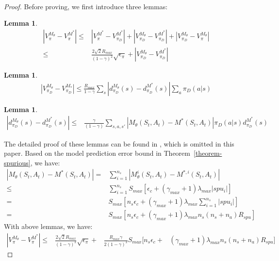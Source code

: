 \documentclass{article}
\theoremstyle{plain}
\newtheorem{lemma}[theorem]{Lemma}
\theoremstyle{definition}
\theoremstyle{remark}
\begin{document}
\begin{proof}

Before proving, we first introduce three lemmas:
\begin{lemma}
\begin{align*}
    |V_{\pi}^{M_\theta}-V_{\pi}^{M^*}|\leq& |V_{\pi}^{M^*}-V_{\pi_D}^{M^*}|+ |V_{\pi_D}^{M_\theta}-V_{\pi_D}^{M^*}|
    +|V_{\pi_D}^{M_\theta}-V_{\pi}^{M_\theta}| \\
     \leq&\frac{2\sqrt{2}R_{max}}{(1-\gamma)^2}\sqrt{\epsilon_\pi}+|V_{\pi_D}^{M_\theta}-V_{\pi_D}^{M^*}|
\end{align*}
\end{lemma}

\begin{lemma}
\begin{align*}
    |V_{\pi_D}^{M_{\theta}}-V_{\pi_D}^{M_{*}}|\leq \frac{R_{max}}{1-\gamma}\sum_s|d_{\pi_D}^{M_\theta}(s)-d_{\pi_D}^{M^*}(s)|\sum_a\pi_D(a|s)
\end{align*}
\end{lemma}

\begin{lemma}
\begin{align*}
    |d_{\pi_D}^{M_\theta}(s)-d_{\pi_D}^{M^*}(s)|
\leq& \frac{\gamma}{(1-\gamma)}\sum_{s,a,s'}|M_\theta(S_t,A_t)-M^*(S_t,A_t)| 
    \pi_D(a|s)d_{\pi_D}^{M^*}(s)
\end{align*}
\end{lemma}
The detailed proof of these lemmas can be found in \cite{DBLP:conf/nips/XuLY20}, which is omitted in this paper.
Based on the model prediction error bound in Theorem~\ref{theorem-spurious}, we have:
\begin{align*}
|M_\theta(S_t,A_t)-M^*(S_t,A_t)|
=&\sum_{i=1}^{n_s}|M_\theta^i(S_t,A_t)-M^{*,i}(S_t,A_t)| \\
\leq&\sum_{i=1}^{n_s} S_{max}[\epsilon_c+(\gamma_{max}+1)\lambda_{max}|spu_i|] \\
=&S_{max}[{n_s}\epsilon_c+(\gamma_{max}+1)\lambda_{max}\sum_{i=1}^{n_s}|spu_i|]\\
=&S_{max}[{n_s}\epsilon_c+(\gamma_{max}+1)\lambda_{max}n_s(n_s+n_a)R_{spu}]
\end{align*}
With above lemmas, we have: 
\begin{align*}
|V_{\pi}^{M_\theta}-V_{\pi}^{M^*}|\leq &
\frac{2\sqrt{2}R_{max}}{(1-\gamma)^2}\sqrt{\epsilon_{\pi}}+
&\frac{R_{max}\gamma}{2(1-\gamma)^2}S_{max}[n_s\epsilon_c+
&(\gamma_{max}+1)\lambda_{max}n_s(n_s+n_a)R_{spu}]
\end{align*}

\end{proof}
\end{document}
